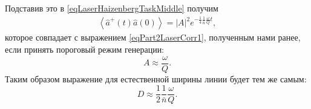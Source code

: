 Подставив это в \eqref{eqLaserHaizenbergTaskMiddle} получим
\begin{eqnarray}
\left<\hat{a}^{+}\left(t\right)\hat{a}\left(0\right)\right> =
\left|A\right|^2 e^{-\frac{1}{4}\frac{1}{\bar{n}}\frac{\omega}{Q} t},
\label{eqLaserHaizenbergTaskMiddleFinal}
\end{eqnarray}
которое совпадает с выражением \eqref{eqPart2LaserCorr1}, полученным
нами ранее, если принять пороговый режим генерации: 
\[
A \approx \frac{\omega}{Q}.
\]
Таким образом выражение для естественной ширины линии будет тем же
самым:
\[
D \approx \frac{1}{2}\frac{1}{\bar{n}}\frac{\omega}{Q}.
\]

